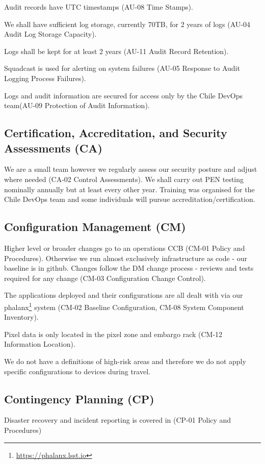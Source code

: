 Audit records have UTC timestamps (AU-08  Time Stamps).

We shall have sufficient log storage, currently 70TB,  for 2 years of logs (AU-04  Audit Log Storage Capacity).

Logs shall be kept for at least 2 years (AU-11  Audit Record Retention).

Squadcast is used for alerting on system failures (AU-05  Response to Audit Logging Process Failures).

Logs and audit information are secured for access only by the Chile DevOps team(AU-09  Protection of Audit Information).


\subsection{Certification, Accreditation, and Security Assessments (CA)} \label{sec:CA}
We are a small team however we regularly assess our security posture and adjust where needed (CA-02  Control Assessments).
We shall carry out PEN testing nominally annually but at least every other year.
Training was organised for the Chile DevOps team and some individuals will pursue accreditation/certification.

\subsection{Configuration Management (CM)} \label{sec:CM}

Higher level or broader changes go to an operations CCB  (CM-01  Policy and Procedures).
Otherwise we run almost exclusively infrastructure as code - our baseline is in github.
Changes follow the DM change process - reviews and tests required for any change (CM-03  Configuration Change Control).


The applications deployed and their configurations are all dealt with via our phalanx\footnote{\url{https://phalanx.lsst.io}} system (CM-02  Baseline Configuration, CM-08  System Component Inventory).

Pixel data is only located in the pixel zone and embargo rack (CM-12  Information Location).


We do not have a definitions of high-risk areas and therefore we do not apply specific configurations to devices during travel.

\subsection{Contingency Planning (CP)} \label{sec:CP}
Disaster recovery and incident reporting is covered in  (CP-01  Policy and Procedures)

